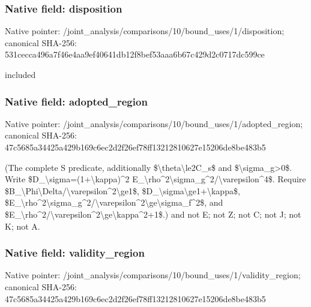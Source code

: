 \documentclass[10pt,a4paper]{article}
\begin{document}
\subsubsection{Native field: disposition}


Native pointer: /joint\_analysis/comparis\allowbreak{}ons/10/bound\_uses/1/disp\allowbreak{}osition; canonical SHA-256: 531cecca496a7f46e4aa9ef4\allowbreak{}0641db12f8bef53aaa6b67c4\allowbreak{}29d2c0717dc599ce


included


\subsubsection{Native field: adopted\_region}


Native pointer: /joint\_analysis/comparis\allowbreak{}ons/10/bound\_uses/1/adop\allowbreak{}ted\_region; canonical SHA-256: 47c5685a34425a429b169c6e\allowbreak{}c2d2f26ef78ff13212810627\allowbreak{}e15206de8be483b5


(The complete S predicate, additionally \$\textbackslash{}theta\textbackslash{}le2C\_s\$ and \$\textbackslash{}sigma\_g>0\$. Write \$D\_\textbackslash{}sigma=(1+\textbackslash{}kappa)\textasciicircum{}2 E\_\textbackslash{}rho\textasciicircum{}2\textbackslash{}sigma\_g\textasciicircum{}2/\textbackslash{}varepsilon\textasciicircum{}4\$. Require \$B\_\textbackslash{}Phi\textbackslash{}Delta/\textbackslash{}varepsilon\textasciicircum{}2\textbackslash{}ge1\$, \$D\_\textbackslash{}sigma\textbackslash{}ge1+\textbackslash{}kappa\$, \$E\_\textbackslash{}rho\textasciicircum{}2\textbackslash{}sigma\_g\textasciicircum{}2/\textbackslash{}var\allowbreak{}epsilon\textasciicircum{}2\textbackslash{}ge\textbackslash{}sigma\_f\textasciicircum{}2\$, and \$E\_\textbackslash{}rho\textasciicircum{}2/\textbackslash{}varepsilon\textasciicircum{}2\textbackslash{}ge\textbackslash{}kappa\textasciicircum{}2+1\$.) and not E; not Z; not C; not J; not K; not A.


\subsubsection{Native field: validity\_region}


Native pointer: /joint\_analysis/comparis\allowbreak{}ons/10/bound\_uses/1/vali\allowbreak{}dity\_region; canonical SHA-256: 47c5685a34425a429b169c6e\allowbreak{}c2d2f26ef78ff13212810627\allowbreak{}e15206de8be483b5
\end{document}
